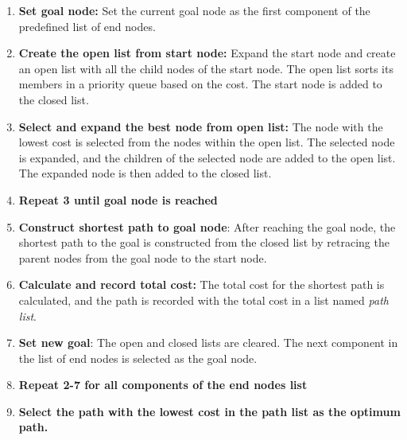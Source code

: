 \begin{enumerate}
\item \textbf{Set goal node:} Set the current goal node as the first component of the predefined list of end nodes. 
\item \textbf{Create the open list from start node:} Expand the start node and create an open list with all the child nodes of the start node. The open list sorts its members in a priority queue based on the cost. The start node is added to the closed list.
\item \textbf{Select and expand the best node from open list:} The node with the lowest cost is selected from the nodes within the open list. The selected node is expanded, and the children of the selected node are added to the open list. The expanded node is then added to the closed list.
\item \textbf{Repeat 3 until goal node is reached}
\item \textbf{Construct shortest path to goal node}: After reaching the goal node, the shortest path to the goal is constructed from the closed list by retracing the parent nodes from the goal node to the start node.
\item \textbf{Calculate and record total cost:} The total cost for the shortest path is calculated, and the path is recorded with the total cost in a list named \textit{path list}.
\item \textbf{Set new goal}: The open and closed lists are cleared. The next component in the list of end nodes is selected as the goal node.
\item \textbf{Repeat 2-7 for all components of the end nodes list}
\item \textbf{Select the path with the lowest cost in the path list as the optimum path.}
\end{enumerate}
